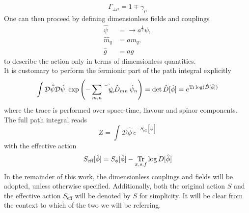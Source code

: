 \begin{equation*}
    \Gamma_{\pm \mu} = 1 \mp \gamma_\mu 
\end{equation*}
One can then proceed by defining dimensionless fields and couplings
\begin{equation*}
    \begin{aligned}
        \hat\psi &= \rightarrow a^{\frac{1}{2}} \psi, \\
        \hat m_q &= a m_q, \\
        \hat g &= a g
    \end{aligned}
    \label{eq:fermionic_theory_dimless_redefinitions}
\end{equation*}
to describe the action only in terms of dimensionless quantities. \\
It is customary to perform the fermionic part of the path integral explicitly
\begin{equation*}
    \int \mathcal{D}\hat{\bar\psi} \mathcal{D}\hat\psi \ \exp\left( - \sum_{m,n} \hat{\bar\psi_m} \, \hat D_{mn} \, \hat\psi_n \right) = \text{det} \, \hat D[\hat\phi] = e^{\operatorname{\text{Tr}} \log (\hat D[\hat\phi])}
\end{equation*}
where the trace is performed over space-time, flavour and spinor components. \\ 
The full path integral  reads 
\begin{equation*}
    Z = \int \mathcal{D}\hat\phi \ e^{-S_\text{eff}[\hat\phi]}
\end{equation*}
with the effective action
\begin{equation*}
    S_\text{eff}[\hat\phi] = S_{\phi}[\hat\phi] - \underset{x,s,f}{\operatorname{\text{Tr}}} \log D[\hat\phi]
\end{equation*}
In the remainder of this work, the dimensionless couplings and fields will be adopted, unless otherwise specified. Additionally, both the original action $S$ and the effective action $S_\text{eff}$ will be denoted by $S$ for simplicity. It will be clear from the context to which of the two we will be referring.
